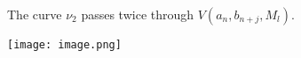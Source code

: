 \documentclass[12pt]{article}
\begin{document}
The curve $\nu_2$ passes twice through $V(a_n,b_{n+j},M_l)$.

\texttt{[image: image.png]}
\end{document}
